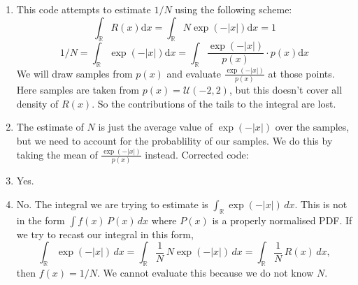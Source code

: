 \begin{solution}
    \begin{enumerate}[label=(\alph*)]
        \item This code attempts to estimate $1/N$ using the following scheme:
        \[
            \int_{\mathbb{R}} R(x)\mathrm{d}x = \int_{\mathbb{R}} N \exp(-|x|)\mathrm{d}x = 1
        \]
        \[
            1/N = \int_{\mathbb{R}} \exp(-|x|)\mathrm{d}x = \int_{\mathbb{R}} \frac{\exp(-|x|)}{p(x)}\cdot p(x)\mathrm{d}x
        \]
        We will draw samples from $p(x)$ and evaluate $\frac{\exp(-|x|)}{p(x)}$ at those points. Here samples are taken from $p(x) = \mathcal{U}(-2,2)$, but this doesn't cover all density of $R(x)$. So the contributions of the tails to the integral are lost.

        \item The estimate of $N$ is just the average value of $\exp(-|x|)$ over the samples, but we need to account for the probablility of our samples. We do this by taking the mean of $\frac{\exp(-|x|)}{p(x)}$ instead. Corrected code:
        


        \item Yes.

        \item No.  The integral we are trying to estimate is
        $\int_{\mathbb{R}} \exp(-|x|)\,dx$.  This is not in the form
        $\int f(x)\,P(x)\,dx$ where $P(x)$ is a properly normalised PDF.
        If we try to recast our integral in this form,
        \[
            \int_{\mathbb{R}} \exp(-|x|)\,dx
            = \int_{\mathbb{R}} \frac{1}{N}\, N\exp(-|x|)\,dx
            = \int_{\mathbb{R}} \frac{1}{N}\, R(x)\,dx,
        \]
        then $f(x) = 1/N$.  We cannot evaluate this because we do not
        know $N$.

    \end{enumerate}
\end{solution}

